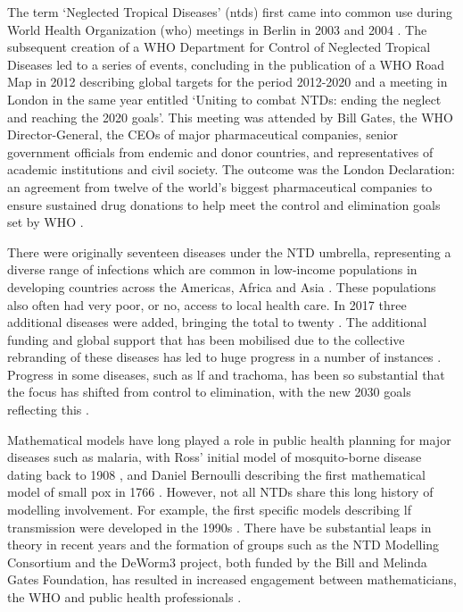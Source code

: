 The term `Neglected Tropical Diseases' (\acrshort{ntds}) first came into common use during World Health Organization (\acrshort{who}) meetings in Berlin in 2003 and 2004 \cite{WHO_NTD}. The subsequent creation of a WHO Department for Control of Neglected Tropical Diseases led to a series of events, concluding in the publication of a WHO Road Map in 2012 describing global targets for the period 2012-2020 \cite{Roadmap} and a meeting in London in the same year entitled `Uniting to combat NTDs: ending the neglect and reaching the 2020 goals'. This meeting was attended by Bill Gates, the WHO Director-General, the CEOs of major pharmaceutical companies, senior government officials from endemic and donor countries, and representatives of academic institutions and civil society. The outcome was the London Declaration: an agreement from twelve of the world’s biggest pharmaceutical companies to ensure sustained drug donations to help meet the control and elimination goals set by WHO \cite{Allen2012}. 

There were originally seventeen diseases under the NTD umbrella, representing a diverse range of infections which are common in low-income populations in developing countries across the Americas, Africa and Asia \cite{Roadmap}. These populations also often had very poor, or no, access to local health care. In 2017 three additional diseases were added, bringing the total to twenty \cite{WHO_NTD}. The additional funding and global support that has been mobilised due to the collective rebranding of these diseases has led to huge progress in a number of instances \cite{rebollo2015,Njenga2011,Minetti2019}. Progress in some diseases, such as \acrlong{lf} and trachoma, has been so substantial that the focus has shifted from control to elimination, with the new 2030 goals reflecting this \cite{WHO2017_GPELF,NTDMC2019}.

Mathematical models have long played a role in public health planning for major diseases such as malaria, with Ross' initial model of mosquito-borne disease dating back to 1908 \cite{Ross1908}, and Daniel Bernoulli describing the first mathematical model of small pox in 1766 \cite{Dietz2000bernoulli}. However, not all NTDs share this long history of modelling involvement. For example, the first specific models describing \gls{lf} transmission were developed in the 1990s \cite{Rochet1990,Plaisier1998}. There have be substantial leaps in theory in recent years and the formation of groups such as the NTD Modelling Consortium and the DeWorm3 project, both funded by the Bill and Melinda Gates Foundation, has resulted in increased engagement between mathematicians, the WHO and public health professionals \cite{NTDMC2019}. 

